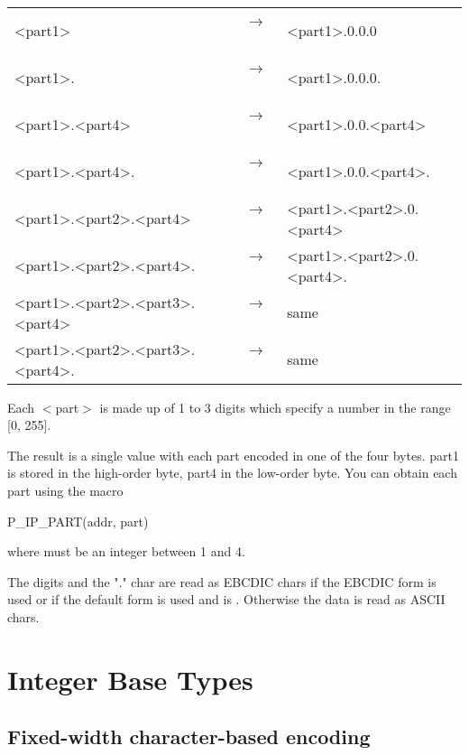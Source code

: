 {\tt
\begin{center}
\begin{tabular}{lcl}
  <part1>                          & ~~$\longrightarrow{}$~~ & <part1>.0.0.0\\
  <part1>.                         & ~~$\longrightarrow{}$~~ & <part1>.0.0.0.\\
  <part1>.<part4>                  & ~~$\longrightarrow{}$~~ & <part1>.0.0.<part4>\\
  <part1>.<part4>.                 & ~~$\longrightarrow{}$~~ & <part1>.0.0.<part4>.\\
  <part1>.<part2>.<part4>          & ~~$\longrightarrow{}$~~ & <part1>.<part2>.0.<part4>\\
  <part1>.<part2>.<part4>.         & ~~$\longrightarrow{}$~~ & <part1>.<part2>.0.<part4>.\\
  <part1>.<part2>.<part3>.<part4>  & ~~$\longrightarrow{}$~~ & same\\
  <part1>.<part2>.<part3>.<part4>. & ~~$\longrightarrow{}$~~ & same\\
\end{tabular}
\end{center}}

Each $<$part$>$ is made up of 1 to 3 digits which specify a number
in the range [0, 255].

The result is a single  value with each part encoded in one
of the four bytes.  part1 is stored in the high-order byte, part4
in the low-order byte.  You can obtain each part using the macro

\begin{centercode}
  P\_IP\_PART(addr, part)
\end{centercode}
where  must be an integer between 1 and 4.

The digits and the "." char are read as EBCDIC chars if the EBCDIC
form is used or if the default form is used and
 is .  Otherwise the data is
read as ASCII chars.

\section{Integer Base Types}

\subsection{Fixed-width character-based encoding}

\aedBegin{}
\aedEnd{}

